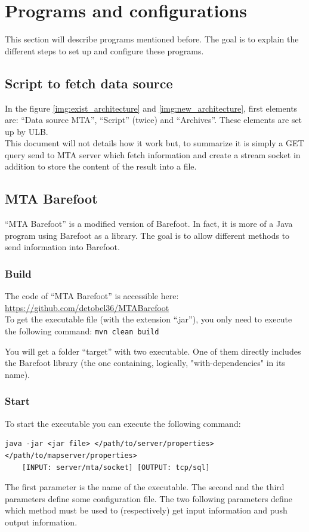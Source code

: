 \documentclass[a4paper,12pt]{article}
\begin{document}
        
\section{Programs and configurations}
    This section will describe programs mentioned before. The goal is to explain the different steps to set up and configure these programs.
    
    \subsection{Script to fetch data source}
        \label{subsec:script_fetch_data}
        In the figure \ref{img:exist_architecture} and \ref{img:new_architecture}, first elements are: ``Data source MTA'', ``Script'' (twice) and ``Archives''. These elements are set up by ULB.\\
        This document will not details how it work but, to summarize it is simply a GET query send to MTA server which fetch information and create a stream socket in addition to store the content of the result into a file.
    
    \subsection{MTA Barefoot}
        ``MTA Barefoot'' is a modified version of Barefoot. In fact, it is more of a Java program using Barefoot as a library. The goal is to allow different methods to send information into Barefoot.\\
        
        \subsubsection{Build}
            The code of ``MTA Barefoot'' is accessible here: \url{https://github.com/detobel36/MTABarefoot}\\
            To get the executable file (with the extension ``.jar''), you only need to execute the following command: \verb|mvn clean build|
            
            You will get a folder ``target'' with two executable. One of them directly includes the Barefoot library (the one containing, logically, "with-dependencies" in its name).
        
        \subsubsection{Start}
            To start the executable you can execute the following command: 
            \begin{verbatim}
java -jar <jar file> </path/to/server/properties> </path/to/mapserver/properties>
    [INPUT: server/mta/socket] [OUTPUT: tcp/sql]\end{verbatim}
            The first parameter is the name of the executable. The second and the third parameters define some configuration file. The two following parameters define which method must be used to (respectively) get input information and push output information.\\
            
\end{document}
